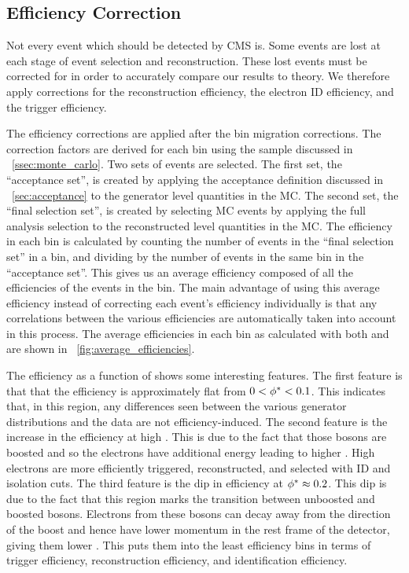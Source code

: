 \subsection{Efficiency Correction}
\label{ssec:eff_correction}

Not every event which should be detected by CMS is. Some events are lost at
each stage of event selection and reconstruction. These lost events must be
corrected for in order to accurately compare our results to theory. We
therefore apply corrections for the reconstruction efficiency, the electron ID
efficiency, and the trigger efficiency.

The efficiency corrections are applied after the bin migration corrections. The
correction factors are derived for each \phistar bin using the \Ztoee \MADGRAPH
sample discussed in \SEC~\ref{ssec:monte_carlo}. Two sets of events are
selected. The first set, the ``acceptance set'', is created by applying the
acceptance definition discussed in \SEC~\ref{sec:acceptance} to the generator
level quantities in the MC. The second set, the ``final selection set'', is
created by selecting MC events by applying the full analysis selection to the
reconstructed level quantities in the MC. The efficiency in each \phistar bin
is calculated by counting the number of events in the ``final selection set''
in a bin, and dividing by the number of events in the same bin in the
``acceptance set''. This gives us an average efficiency composed of all the
efficiencies of the events in the bin. The main advantage of using this average
efficiency instead of correcting each event's efficiency individually is that
any correlations between the various efficiencies are automatically taken into
account in this process. The average efficiencies in each bin as calculated with
both \MADGRAPH and \POWHEG are shown in \FIG~\ref{fig:average_efficiencies}.

The efficiency as a function of \phistar shows some interesting features. The
first feature is that that the efficiency is approximately flat from $0 <
\phi^{*} < 0.1$. This indicates that, in this region, any differences seen
between the various generator \phistar distributions and the data are not
efficiency-induced. The second feature is the increase in the efficiency at
high \phistar. This is due to the fact that those \Z bosons are boosted and so
the electrons have additional energy leading to higher \pt. High \pt electrons
are more efficiently triggered, reconstructed, and selected with ID and
isolation cuts. The third feature is the dip in efficiency at $\phi^{*} \approx
0.2$. This dip is due to the fact that this \phistar region marks the
transition between unboosted and boosted \Z bosons. Electrons from these \Z
bosons can decay away from the direction of the boost and hence have lower
momentum in the rest frame of the detector, giving them lower \pt. This puts
them into the least efficiency bins in terms of trigger efficiency,
reconstruction efficiency, and identification efficiency.


